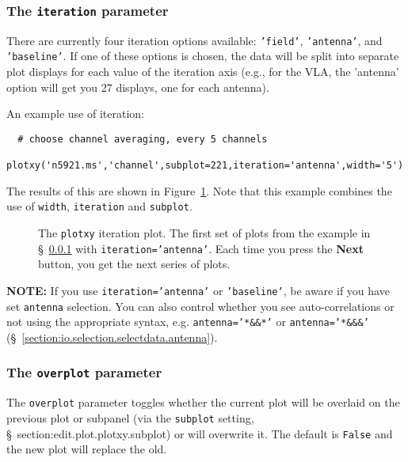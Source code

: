 \subsubsection{ The {\tt iteration} parameter}
\label{section:edit.plot.plotxy.iter}

There are currently four iteration options available:
{\tt 'field'}, {\tt 'antenna'}, and {\tt 'baseline'}.  
If one of these options
is chosen, the data will be split into separate plot displays for each
value of the iteration axis (e.g., for the VLA, the 'antenna' option
will get you 27 displays, one for each antenna).  

An example use of iteration:
\small
\begin{verbatim}
  # choose channel averaging, every 5 channels
  plotxy('n5921.ms','channel',subplot=221,iteration='antenna',width='5')
\end{verbatim}
\normalsize
The results of this are shown in Figure~\ref{fig:plotiter}.  Note
that this example combines the use of {\tt width}, {\tt iteration}
and {\tt subplot}.

\begin{figure}[h!]
\begin{center}
\caption{\label{fig:plotiter} The {\tt plotxy} iteration plot.
  The first set of plots from the example in
  \S~\ref{section:edit.plot.plotxy.iter} with {\tt iteration='antenna'}.
  Each time you press the {\bf Next} button, you
  get the next series of plots.} 
\hrulefill
\end{center}
\end{figure}

{\bf NOTE:} If you use {\tt iteration='antenna'} or {\tt 'baseline'},
be aware if you have set {\tt antenna} selection.  You can also
control whether you see auto-correlations or not using the appropriate
syntax, e.g. {\tt antenna='*\&\&*'} or {\tt antenna='*\&\&\&'}
(\S~\ref{section:io.selection.selectdata.antenna}).

\subsubsection{ The {\tt overplot} parameter}
\label{section:edit.plot.plotxy.overplot}

The {\tt overplot} parameter toggles whether the current plot will
be overlaid on the previous plot or subpanel (via the {\tt subplot}
setting, \S~{section:edit.plot.plotxy.subplot}) or will overwrite it.
The default is {\tt False} and the new plot will replace the old.

